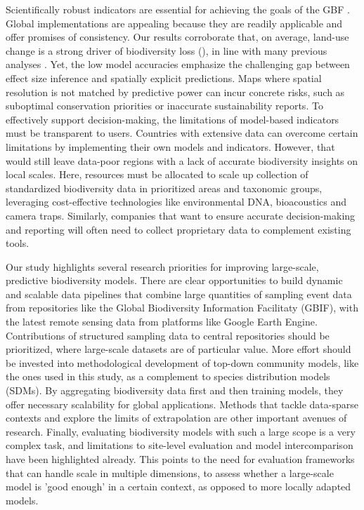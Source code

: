 Scientifically robust indicators are essential for achieving the goals of the GBF \cite{affinito2024,gbfmf2025}. Global implementations are appealing because they are readily applicable and offer promises of consistency\cite{ipbes2019}. Our results corroborate that, on average, land-use change is a strong driver of biodiversity loss (), in line with many previous analyses \cite{keck2025,jaureguiberry2022,newbold2015,depalma2021,bevan2024}. Yet, the low model accuracies emphasize the challenging gap between effect size inference and spatially explicit predictions. Maps where spatial resolution is not matched by predictive power can incur concrete risks, such as suboptimal conservation priorities or inaccurate sustainability reports. To effectively support decision-making, the limitations of model-based indicators must be transparent to users. Countries with extensive data can overcome certain limitations by implementing their own models and indicators\cite{gbfmf2025,affinito2024}. However, that would still leave data-poor regions with a lack of accurate biodiversity insights on local scales\cite{clements2025}. Here, resources must be allocated to scale up collection of standardized biodiversity data in prioritized areas and taxonomic groups\cite{hughes2021,gonzalez2023}, leveraging cost-effective technologies like environmental DNA, bioacoustics and camera traps. Similarly, companies that want to ensure accurate decision-making and reporting will often need to collect proprietary data to complement existing tools\cite{goodsell2025}.



Our study highlights several research priorities for improving large-scale, predictive biodiversity models. There are clear opportunities to build dynamic and scalable data pipelines that combine large quantities of sampling event data from repositories like the Global Biodiversity Information Facilitaty (GBIF), with the latest remote sensing data from platforms like Google Earth Engine. Contributions of structured sampling data to central repositories should be prioritized, where large-scale datasets are of particular value. More effort should be invested into methodological development of top-down community models, like the ones used in this study, as a complement to species distribution models (SDMs). By aggregating biodiversity data first and then training models, they offer necessary scalability for global applications. Methods that tackle data-sparse contexts and explore the limits of extrapolation are other important avenues of research. Finally, evaluating biodiversity models with such a large scope is a very complex task, and limitations to site-level evaluation and model intercomparison have been highlighted already. This points to the need for evaluation frameworks that can handle scale in multiple dimensions, to assess whether a large-scale model is 'good enough' in a certain context, as opposed to more locally adapted models.


